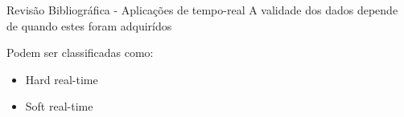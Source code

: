 \begin{frame}{Revis\~{a}o Bibliogr\'{a}fica - Aplicações de tempo-real}
	A validade dos dados depende de quando estes foram adquir\'{i}dos
	
	\medskip
	Podem ser classificadas como:
	\begin{itemize}
		\item Hard real-time
		\item Soft real-time
	\end{itemize}
\end{frame}